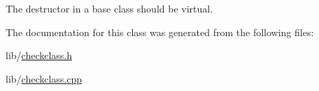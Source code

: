 The destructor in a base class should be virtual. 



The documentation for this class was generated from the following files\-:\begin{DoxyCompactItemize}
\item 
lib/\hyperlink{checkclass_8h}{checkclass.\-h}\item 
lib/\hyperlink{checkclass_8cpp}{checkclass.\-cpp}\end{DoxyCompactItemize}

